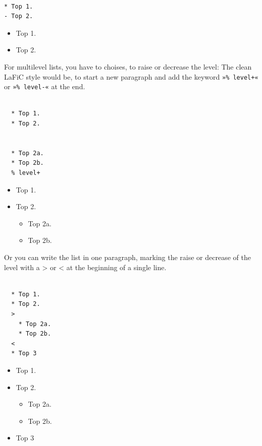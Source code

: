 \documentclass{article}
\begin{document}
\begin{verbatim}

* Top 1.
- Top 2.
\end{verbatim}


\begin{itemize}
\item Top 1.
\item Top 2.
\end{itemize}


{For multilevel lists, you have to choises, to raise or
decrease the level: The clean LaFiC style would be,
to start a new paragraph and add the keyword \texttt{»\% level+«}
or \texttt{»\% level-«} at the end.\\}

\begin{verbatim}

  * Top 1.
  * Top 2.


  * Top 2a.
  * Top 2b.
  % level+
\end{verbatim}


\begin{itemize}
\item Top 1.
\item Top 2.

\begin{itemize}
\item Top 2a.
\item Top 2b.
\end{itemize}

\end{itemize}


{Or you can write the list in one paragraph, marking the
raise or decrease of the level with a > or < at the
beginning of a single line.\\}

\begin{verbatim}

  * Top 1.
  * Top 2.
  >
    * Top 2a.
    * Top 2b.
  <
  * Top 3
\end{verbatim}


\begin{itemize}
\item Top 1.
\item Top 2.
\begin{itemize}
\item Top 2a.
\item Top 2b.
\end{itemize}
\item Top 3
\end{itemize}
\end{document}
